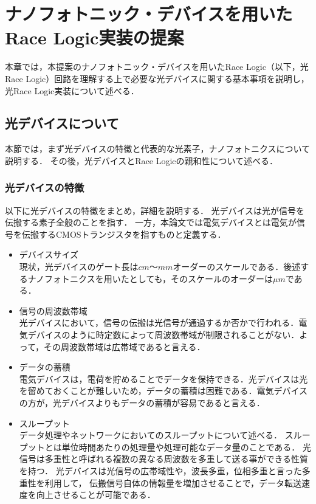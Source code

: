 \chapter{ナノフォトニック・デバイスを用いたRace Logic実装の提案}
本章では，本提案のナノフォトニック・デバイスを用いたRace Logic（以下，光Race Logic）回路を理解する上で必要な光デバイスに関する基本事項を説明し，光Race Logic実装について述べる．

\section{光デバイスについて}
本節では，まず光デバイスの特徴と代表的な光素子，ナノフォトニクスについて説明する．
その後，光デバイスとRace Logicの親和性について述べる．

\subsection{光デバイスの特徴}
以下に光デバイスの特徴をまとめ，詳細を説明する．
光デバイスは光が信号を伝搬する素子全般のことを指す．
一方，本論文では電気デバイスとは電気が信号を伝搬するCMOSトランジスタを指すものと定義する．
\begin{itemize}
\item デバイスサイズ\\
現状，光デバイスのゲート長は$cm$〜$mm$オーダーのスケールである．後述するナノフォトニクスを用いたとしても，そのスケールのオーダーは$\mu m$である．
\item 信号の周波数帯域\\
光デバイスにおいて，信号の伝搬は光信号が通過するか否かで行われる．電気デバイスのように時定数によって周波数帯域が制限されることがない．よって，その周波数帯域は広帯域であると言える．
\item データの蓄積\\
電気デバイスは，電荷を貯めることでデータを保持できる．光デバイスは光を留めておくことが難しいため，データの蓄積は困難である．電気デバイスの方が，光デバイスよりもデータの蓄積が容易であると言える．
\item スループット\\
データ処理やネットワークにおいてのスループットについて述べる．
スループットとは単位時間あたりの処理量や処理可能なデータ量のことである．
光信号は多重性と呼ばれる複数の異なる周波数を多重して送る事ができる性質を持つ．
光デバイスは光信号の広帯域性や，波長多重，位相多重と言った多重性を利用して，
伝搬信号自体の情報量を増加させることで，データ転送速度を向上させることが可能である．
\end{itemize}

